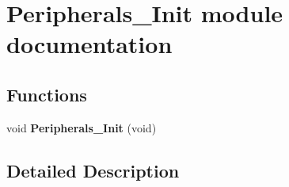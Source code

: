 \hypertarget{group___peripherals___init__module}{}\section{Peripherals\+\_\+\+Init module documentation}
\label{group___peripherals___init__module}
\subsection*{Functions}
\begin{DoxyCompactItemize}
\item 
void {\bfseries Peripherals\+\_\+\+Init} (void)\hypertarget{group___peripherals___init__module_gabf8fc62798e3a4fd699c17055db2a690}{}\label{group___peripherals___init__module_gabf8fc62798e3a4fd699c17055db2a690}

\end{DoxyCompactItemize}


\subsection{Detailed Description}
